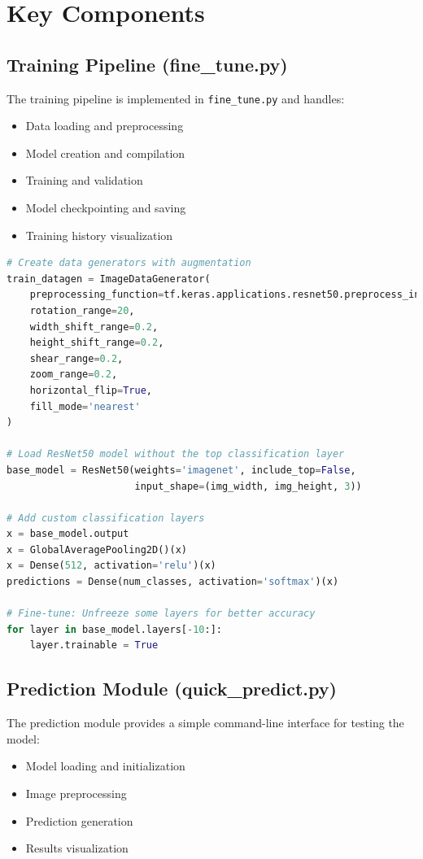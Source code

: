 \documentclass[11pt,a4paper]{report}
\begin{document}
\section{Key Components}

\subsection{Training Pipeline (fine\_tune.py)}
The training pipeline is implemented in \texttt{fine\_tune.py} and handles:

\begin{itemize}
    \item Data loading and preprocessing
    \item Model creation and compilation
    \item Training and validation
    \item Model checkpointing and saving
    \item Training history visualization
\end{itemize}

\begin{lstlisting}[language=Python, caption=Key sections of the training pipeline]
# Create data generators with augmentation
train_datagen = ImageDataGenerator(
    preprocessing_function=tf.keras.applications.resnet50.preprocess_input,
    rotation_range=20,
    width_shift_range=0.2,
    height_shift_range=0.2,
    shear_range=0.2,
    zoom_range=0.2,
    horizontal_flip=True,
    fill_mode='nearest'
)

# Load ResNet50 model without the top classification layer
base_model = ResNet50(weights='imagenet', include_top=False, 
                      input_shape=(img_width, img_height, 3))

# Add custom classification layers
x = base_model.output
x = GlobalAveragePooling2D()(x)
x = Dense(512, activation='relu')(x)
predictions = Dense(num_classes, activation='softmax')(x)

# Fine-tune: Unfreeze some layers for better accuracy
for layer in base_model.layers[-10:]:
    layer.trainable = True
\end{lstlisting}

\subsection{Prediction Module (quick\_predict.py)}
The prediction module provides a simple command-line interface for testing the model:

\begin{itemize}
    \item Model loading and initialization
    \item Image preprocessing
    \item Prediction generation
    \item Results visualization
\end{itemize}
\end{document}

